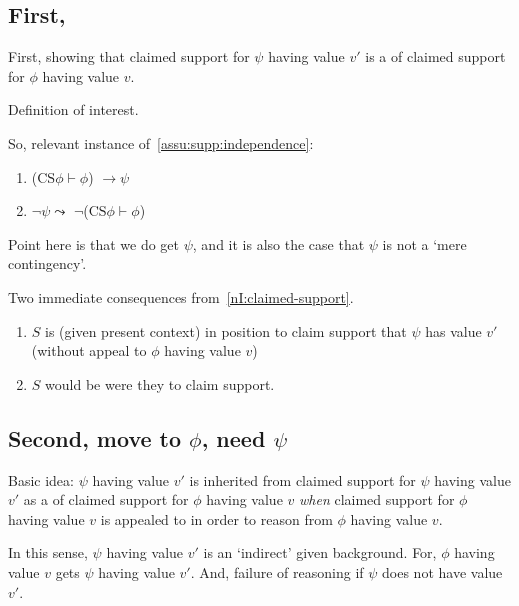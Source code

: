 \subsection{First, \requ{}}

\begin{note}
  First, showing that claimed support for \(\psi\) having value \(v'\) is a \requ{} of claimed support for \(\phi\) having value \(v\).

  \begin{note}
    Definition of interest.
    \begin{quote}
      \vspace{-\baselineskip}
    \end{quote}
  \end{note}
\end{note}

\begin{note}
  So, relevant instance of~\autoref{assu:supp:independence}:
  \begin{enumerate}
  \item (\(\text{CS}\phi \vdash \phi\)) \(\rightarrow \psi\)
  \item \(\lnot\psi \leadsto\) \(\lnot\)(\(\text{CS}\phi \vdash \phi\))
  \end{enumerate}

  Point here is that we do get \(\psi\), and it is also the case that \(\psi\) is not a `mere contingency'.
\end{note}

\begin{note}
  Two immediate consequences from~\ref{nI:claimed-support}.
  \begin{enumerate}
  \item \(S\) is (given present context) in position to claim support that \(\psi\) has value \(v'\) (without appeal to \(\phi\) having value \(v\))
  \item \(S\) would be \nmom{} were they to claim support.
  \end{enumerate}
\end{note}

\subsection{Second, move to \(\phi\), need \(\psi\)}

\begin{note}
  Basic idea:
  \(\psi\) having value \(v'\) is inherited from claimed support for \(\psi\) having value \(v'\) as a \requ{} of claimed support for \(\phi\) having value \(v\) \emph{when} claimed support for \(\phi\) having value \(v\) is appealed to in order to reason from \(\phi\) having value \(v\).

  In this sense, \(\psi\) having value \(v'\) is an `indirect' \requ{} given background.
  For, \(\phi\) having value \(v\) gets \(\psi\) having value \(v'\).
  And, failure of reasoning if \(\psi\) does not have value \(v'\).
\end{note}

